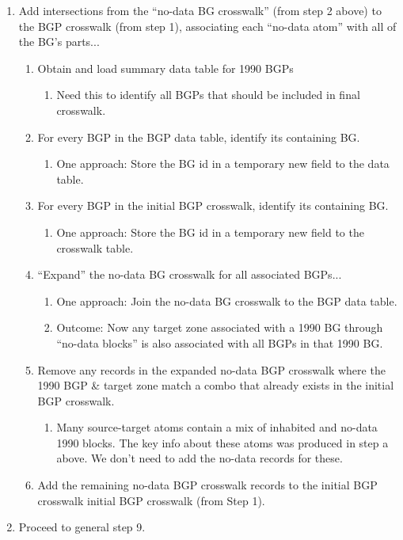 \documentclass{article}
\begin{document}
\begin{enumerate}
\item Add intersections from the ``no-data BG crosswalk'' (from step 2 above) to the BGP crosswalk (from step 1), associating each ``no-data atom'' with all of the BG's parts...
    \begin{enumerate}
    \item Obtain and load summary data table for 1990 BGPs
        \begin{enumerate}
        \item Need this to identify all BGPs that should be included in final crosswalk.
        \end{enumerate}
    \item For every BGP in the BGP data table, identify its containing BG.
        \begin{enumerate}
        \item One approach: Store the BG id in a temporary new field to the data table.
        \end{enumerate}
    \item For every BGP in the initial BGP crosswalk, identify its containing BG.
        \begin{enumerate}
        \item One approach: Store the BG id in a temporary new field to the crosswalk table.
        \end{enumerate}
    \item ``Expand'' the no-data BG crosswalk for all associated BGPs...
        \begin{enumerate}
        \item One approach: Join the no-data BG crosswalk to the BGP data table.
        \item Outcome: Now any target zone associated with a 1990 BG through ``no-data blocks'' is also associated with all BGPs in that 1990 BG.
        \end{enumerate}
    \item Remove any records in the expanded no-data BGP crosswalk where the 1990 BGP \& target zone match a combo that already exists in the initial BGP crosswalk.
        \begin{enumerate}
        \item Many source-target atoms contain a mix of inhabited and no-data 1990 blocks. The key info about these atoms was produced in step a above. We don't need to add the no-data records for these.
        \end{enumerate}
    \item Add the remaining no-data BGP crosswalk records to the initial BGP crosswalk initial BGP crosswalk (from Step 1).
    
    \end{enumerate}

\item Proceed to general step 9.

\end{enumerate}
\end{document}
